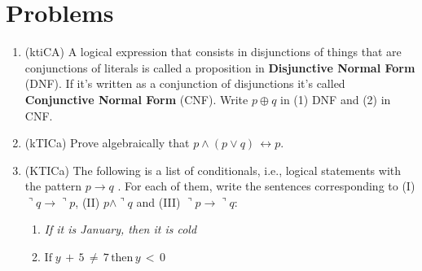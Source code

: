 \documentclass{article}
\begin{document}
\section{Problems}
\begin{enumerate}
\item (ktiCA) A logical expression that consists in disjunctions of things that are conjunctions of literals is called a proposition in {\bf Disjunctive Normal Form} (DNF). If
it's written as a conjunction of disjunctions it's called {\bf Conjunctive Normal Form} (CNF). Write $p\oplus q$ in (1) DNF and (2) in CNF.
\item (kTICa) Prove algebraically that $p\wedge (p\vee q)\,\leftrightarrow p$.
\item (KTICa) The following is a list of conditionals, i.e., logical statements with the pattern $p\rightarrow q$ . For each of them, write the sentences corresponding to
(I) $\urcorner q \rightarrow \urcorner p$, (II) $p\wedge \urcorner q$ and  (III) $\urcorner p \rightarrow \urcorner q$:
\begin{enumerate}
\item {\sl If it is January, then it is cold}
\item $\mbox{If}\;y\,+\,5\,\neq\,7\,\mbox{then}\,y\,<\,0$
\end{enumerate}
\end{enumerate}
\end{document}
